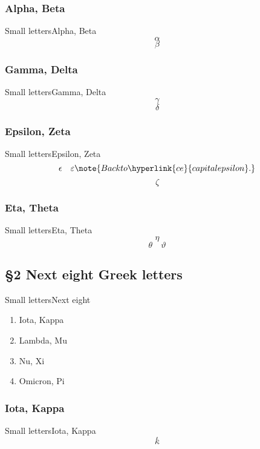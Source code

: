 \documentclass{beamer}
\begin{document}
         \subsubsection{Alpha, Beta}
            \begin{frame}{Small letters}{Alpha, Beta}
               \[ \alpha \]
               \[ \beta \]
            \end{frame}
         \subsubsection{Gamma, Delta}
            \begin{frame}{Small letters}{Gamma, Delta}
               \[ \gamma \]
               \[ \delta \]
            \end{frame}
         \subsubsection{Epsilon, Zeta}
            \begin{frame}[label=se]{Small letters}{Epsilon, Zeta}
               \[ \epsilon \quad \varepsilon \note{Back to \hyperlink{ce}{capital epsilon}.} \]
               \[ \zeta \]
            \end{frame}
         \subsubsection{Eta, Theta}
            \begin{frame}{Small letters}{Eta, Theta}
               \[ \eta \]
               \[ \theta \quad \vartheta \]
            \end{frame}
      \subsection{§2 Next eight Greek letters}
         \begin{frame}{Small letters}{Next eight}
            \begin{enumerate}
               \item Iota, Kappa
               \item Lambda, Mu
               \item Nu, Xi
               \item Omicron, Pi
            \end{enumerate}
         \end{frame}
         \subsubsection{Iota, Kappa}
            \begin{frame}{Small letters}{Iota, Kappa}
               \[ \iota \]
               \[ \kappa \]
            \end{frame}
\end{document}
